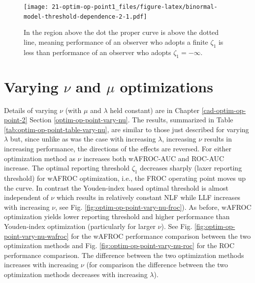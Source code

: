 \documentclass[
]{book}
\begin{document}
\begin{figure}
\centering
\texttt{[image: 21-optim-op-point1\_files/figure-latex/binormal-model-threshold-dependence-2-1.pdf]}
\caption{\label{fig:binormal-model-threshold-dependence-2}In the region above the dot the proper curve is above the dotted line, meaning performance of an observer who adopts a finite \(\zeta_1\) is less than performance of an observer who adopts \(\zeta_1 = -\infty\).}
\end{figure}

\hypertarget{optim-op-point-vary-nu-mu}{%
\section{\texorpdfstring{Varying \(\nu\) and \(\mu\) optimizations}{Varying \textbackslash nu and \textbackslash mu optimizations}}\label{optim-op-point-vary-nu-mu}}

Details of varying \(\nu\) (with \(\mu\) and \(\lambda\) held constant) are in Chapter \ref{cad-optim-op-point-2} Section \ref{optim-op-point-vary-nu}. The results, summarized in Table \ref{tab:optim-op-point-table-vary-nu}, are similar to those just described for varying \(\lambda\) but, since unlike as was the case with increasing \(\lambda\), increasing \(\nu\) results in increasing performance, the directions of the effects are reversed. For either optimization method as \(\nu\) increases both wAFROC-AUC and ROC-AUC increase. The optimal reporting threshold \(\zeta_1\) decreases sharply (laxer reporting threshold) for wAFROC optimization, i.e., the FROC operating point moves up the curve. In contrast the Youden-index based optimal threshold is almost independent of \(\nu\) which results in relatively constant NLF while LLF increases with increasing \(\nu\), see Fig. \ref{fig:optim-op-point-vary-nu-froc}). As before, wAFROC optimization yields lower reporting threshold and higher performance than Youden-index optimization (particularly for larger \(\nu\)). See Fig. \ref{fig:optim-op-point-vary-nu-wafroc} for the wAFROC performance comparison between the two optimization methods and Fig. \ref{fig:optim-op-point-vary-nu-roc} for the ROC performance comparison. The difference between the two optimization methods increases with increasing \(\nu\) (for comparison the difference between the two optimization methods decreases with increasing \(\lambda\)).
\end{document}
